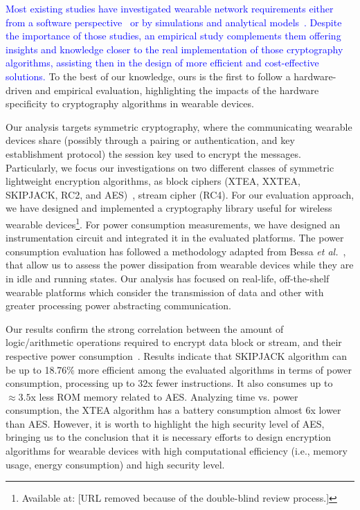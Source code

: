 \documentclass[journal]{IEEEtran}
\newcommand{\rever}{\textcolor{blue}}
\begin{document}
 \rever{Most existing studies have investigated wearable network requirements either from a software perspective~\cite{kerckhof2012towards,sallam2018survey} or by simulations and analytical models~\cite{cazorla2013survey,el2017equalized}. Despite the importance of those studies, an empirical study complements them offering insights and knowledge closer to the real implementation of those cryptography algorithms, assisting then in the design of more efficient and cost-effective solutions.} To the best of our knowledge, ours is the first to follow a hardware-driven and empirical evaluation, highlighting the impacts of the hardware specificity to cryptography algorithms in wearable devices.

Our analysis targets symmetric cryptography, where the communicating wearable devices share (possibly through a pairing or authentication, and key establishment protocol) the session key used to encrypt the messages. Particularly, we focus our investigations on two different classes of symmetric lightweight encryption algorithms, as block ciphers (XTEA, XXTEA, SKIPJACK, RC2, and AES)~\cite{Moh:2015}, stream cipher (RC4). For our evaluation approach, we have designed and implemented a cryptography library useful for wireless wearable devices\footnote{Available at: [URL removed because of the double-blind review process.]%
}. For power consumption measurements, we have designed an instrumentation circuit and integrated it in the evaluated platforms. The power consumption evaluation has followed a methodology adapted from Bessa \emph{et al.}~\cite{bessa2017jetsonleap}, that allow us to assess the power dissipation from wearable devices while they are in idle and running states. Our analysis has focused on real-life, off-the-shelf wearable platforms which consider the transmission of data and other with greater processing power abstracting communication.

Our results confirm the strong correlation between the amount of logic/arithmetic operations required to encrypt data block or stream, and their respective power consumption~\cite{mohd2018lightweight}.  Results indicate that SKIPJACK algorithm can be up to 18.76\% more efficient among the evaluated algorithms in terms of power consumption, processing up to 32x fewer instructions. It also consumes up to $\approx 3.5$x less ROM memory related to AES. Analyzing time vs. power consumption, the XTEA algorithm has a battery consumption almost 6x lower than AES. However, it is worth to highlight the high security level of AES, bringing us to the conclusion that it is necessary efforts to design encryption algorithms for wearable devices with high computational efficiency (i.e., memory usage, energy consumption) and high security level.
\end{document}
